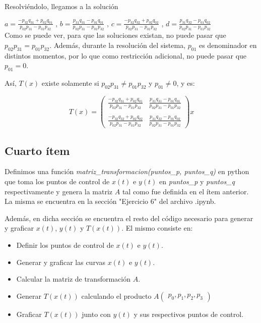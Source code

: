 \documentclass{article}
\begin{document}
Resolviéndolo, llegamos a la solución

$a = \frac{-p_{32}q_{31} + p_{02}q_{01}}{p_{02}p_{31} - p_{01}p_{32}} $ , $b = \frac{p_{31}q_{31} - p_{01}q_{01}}{p_{02}p_{31} - p_{01}p_{32}} $ , $c = \frac{-p_{32}q_{32} + p_{02}q_{02}}{p_{02}p_{31} - p_{01}p_{32}} $ , $d = \frac{p_{31}q_{32} - p_{01}q_{02}}{p_{02}p_{31} - p_{01}p_{32}} $ \\

Como se puede ver, para que las soluciones existan, no puede pasar que $p_{02}p_{31} = p_{01}p_{32}$. Además, durante la resolución del sistema, $p_{01}$ es denominador en distintos momentos, por lo que como restricción adicional, no puede pasar  que $p_{01} = 0$.

Así, $T(x)$ existe solamente si $p_{02}p_{31} \neq p_{01}p_{32}$ y $p_{01} \neq 0$, y es:

$$ T(x) = 
\begin{pmatrix}
\frac{-p_{32}q_{31} + p_{02}q_{01}}{p_{02}p_{31} - p_{01}p_{32}} & \frac{p_{31}q_{31} - p_{01}q_{01}}{p_{02}p_{31} - p_{01}p_{32}}\\
\\
\frac{-p_{32}q_{32} + p_{02}q_{02}}{p_{02}p_{31} - p_{01}p_{32}} & \frac{p_{31}q_{32} - p_{01}q_{02}}{p_{02}p_{31} - p_{01}p_{32}}
\end{pmatrix}
x
$$

\subsection*{Cuarto ítem}
Definimos una función \textit{matriz\_transformacion(puntos\_p, puntos\_q)} en python que toma los puntos de control de $x(t)$ e $y(t)$ en \textit{puntos\_p} y \textit{puntos\_q} respectivamente y genera la matriz $A$ tal como fue definida en el ítem anterior. La misma se encuentra en la sección "Ejercicio 6" del archivo .ipynb. 

Además, en dicha sección se encuentra el resto del código necesario para generar y graficar $x(t)$, $y(t)$ y $T(x(t))$. El mismo consiste en:
\begin{itemize}
    \item Definir los puntos de control de $x(t)$ e $y(t)$.
    \item Generar y graficar las curvas $x(t)$ e $y(t)$.
    \item Calcular la matriz de transformación $A$.
    \item Generar $T(x(t))$ calculando el producto $A\begin{pmatrix}p_0, p_1, p_2, p_3 \end{pmatrix}$
    \item Graficar $T(x(t))$ junto con $y(t)$ y sus respectivos puntos de control.
\end{itemize}
\end{document}
